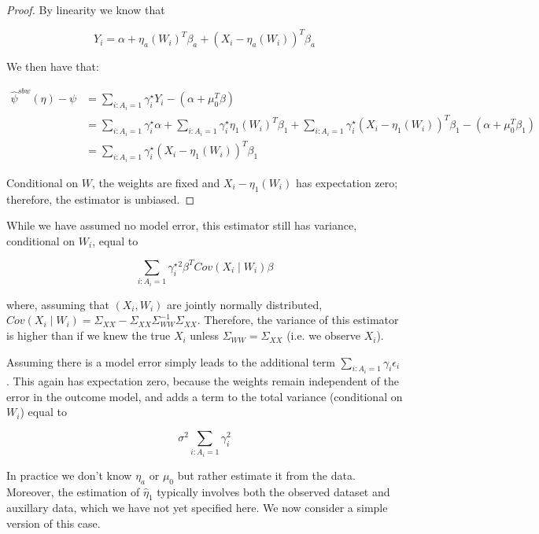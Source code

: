\begin{proof}

By linearity we know that

$$
Y_i = \alpha + \eta_a(W_i)^T\beta_a + (X_i - \eta_a(W_i))^T\beta_a
$$

We then have that:

\begin{align*}
    \hat{\psi}^{sbw}(\eta) - \psi &= \sum_{i: A_i = 1}\gamma_i^\star Y_i - (\alpha + \mu_0^T\beta) \\
    &= \sum_{i: A_i = 1}\gamma_i^\star\alpha + \sum_{i: A_i = 1}\gamma_i^\star\eta_1(W_i)^T\beta_1 + \sum_{i: A_i = 1}\gamma_i^\star(X_i - \eta_1(W_i))^T\beta_1 - (\alpha + \mu_0^T\beta_1) \\
    &= \sum_{i: A_i = 1}\gamma_i^\star(X_i - \eta_1(W_i))^T\beta_1
\end{align*}

Conditional on $W$, the weights are fixed and $X_i - \eta_1(W_i)$ has expectation zero; therefore, the estimator is unbiased.

\end{proof}
\begin{remark}

While we have assumed no model error, this estimator still has variance, conditional on $W_i$, equal to

$$
\sum_{i: A_i = 1} \gamma_i^\star^2\beta^TCov(X_i \mid W_i)\beta
$$

where, assuming that $(X_i, W_i)$ are jointly normally distributed, $Cov(X_i \mid W_i) = \Sigma_{XX} - \Sigma_{XX}\Sigma_{WW}^{-1}\Sigma_{XX}$. Therefore, the variance of this estimator is higher than if we knew the true $X_i$ unless $\Sigma_{WW} = \Sigma_{XX}$ (i.e. we observe $X_i$). 

\end{remark}

\begin{remark}
Assuming there is a model error simply leads to the additional term $\sum_{i: A_i = 1}\gamma_i\epsilon_i$. This again has expectation zero, because the weights remain independent of the error in the outcome model, and adds a term to the total variance (conditional on $W_i$) equal to

$$
\sigma^2\sum_{i: A_i = 1}\gamma_i^2
$$
\end{remark}

In practice we don't know $\eta_a$ or $\mu_0$ but rather estimate it from the data. Moreover, the estimation of $\hat{\eta}_1$ typically involves both the observed dataset and auxillary data, which we have not yet specified here. We now consider a simple version of this case.

